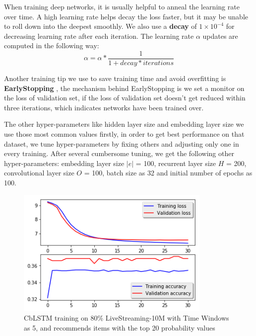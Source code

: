 \documentclass[runningheads]{llncs}
\begin{document}
When training deep networks, it is usually helpful to anneal the learning rate over time. A high learning rate helps decay the loss faster, but it may be unable to roll down into the deepest smoothly. We also use a \textbf{decay} \cite{22} of $1\times 10^{-4}$ for decreasing learning rate after each iteration. The learning rate $\alpha$ updates are computed in the following way:
\begin{equation}
\alpha = \alpha * \frac{1}{1 + decay * iterations}
\end{equation}

Another training tip we use to save training time and avoid overfitting is \textbf{EarlyStopping} \cite{22}, the mechanism behind EarlyStopping is we set a monitor on the loss of validation set, if the loss of validation set doesn't get reduced within three iterations, which indicates networks have been trained over.

The other hyper-parameters like hidden layer size and embedding layer size we use those most common values firstly,
in order to get best performance on that dataset, we tune hyper-parameters by fixing others and adjusting only one in every training. After several cumbersome tuning, we get the following other hyper-parameters: embedding layer size $|e|$ = 100, recurrent layer size $H$ = 200, convolutional layer size $O$ = 100, batch size as 32 and initial number of epochs as 100.
\begin{figure}[htbp]
\centerline
{\includegraphics[height=6.2cm]{image/10thousand@6.png}}
\caption{CbLSTM training on 80\% LiveStreaming-10M with Time Windows as 5, and recommends items with the top 20 probability values}
\label{fig}
\end{figure}
\end{document}
